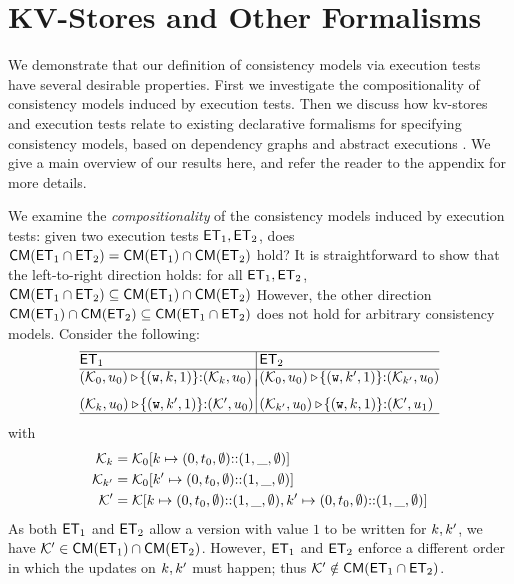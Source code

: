 \newcommand{\execs}{\ensuremath{\mathsf{Execs}}}

\section{KV-Stores and Other Formalisms}
\label{sec:other_formalisms}

We demonstrate that our definition of consistency models via 
execution tests have several desirable properties. 
First we investigate the compositionality of consistency models 
induced by execution tests. Then we discuss how kv-stores and execution 
tests relate to existing declarative formalisms for specifying  
consistency models, based on dependency graphs \cite{adya} 
and abstract executions \cite{framework-concur}. 
We give a main overview of our results here, and refer the reader to the 
appendix for more details.

We examine the \emph{compositionality} of the  consistency models induced by execution tests:  
\ie given two execution tests $\mathsf{ET}_1, \mathsf{ET}_2$, does 
$\mathsf{CM}(\mathsf{ET}_1 \cap \mathsf{ET}_2) = \mathsf{CM}(\mathsf{ET}_1) \cap \mathsf{CM}(\mathsf{ET}_2)$ hold? 
It is straightforward to show that the left-to-right direction holds: for all $\mathsf{ET}_1, \mathsf{ET}_2$, \( \mathsf{CM}(\mathsf{ET}_1 \cap \mathsf{ET}_2) \subseteq \mathsf{CM}(\mathsf{ET}_1) \cap \mathsf{CM}(\mathsf{ET}_2) \) 
However, the other direction \( \mathsf{CM}(\mathsf{ET}_1) \cap \mathsf{CM}(\mathsf{ET}_2) \subseteq \mathsf{CM}(\mathsf{ET}_1 \cap \mathsf{ET}_2) \) does not hold for arbitrary consistency models.
Consider the following:
\[
\small
\begin{array}{@{}l @{\hspace{2pt}} | @{\hspace{2pt}} l@{}}
    \hline
    \ET_1 & \ET_2 \\
%    
    \hline
    (\hh_{0}, \vi_{0}) \csat\! \{(\otW, \ke, 1)\} {:} ( \hh_{\ke}, \vi_{0})
    &
    (\hh_{0}, \vi_{0}) \csat\! \{(\otW, \ke', 1)\} {:} ( \hh_{\ke'}, \vi_{0}) 
    \vspace{-5pt}\\\\
    (\hh_{\ke}, \vi_{0}) \csat  \!\{(\otW, \ke', 1)\} {:} (\hh',\vi_{0}) 
    &
    (\hh_{\ke'}, \vi_{0}) \csat \!\{(\otW, \ke, 1)\} {:} (\hh',\vi_{1}) 
    \\
\hline
\end{array}
\]
with 
\begin{align*}
    \mathcal{K}_{k} & = \mathcal{K}_{0}[k \mapsto (0, t_{0}, \emptyset) \mathbb{::} (1, \_, \emptyset)] \\
    \mathcal{K}_{k'} & = \mathcal{K}_{0}[k' \mapsto (0, t_{0}, \emptyset) \mathbb{::} (1, \_, \emptyset)] \\
    \mathcal{K}' & = \mathcal{K}[k \mapsto (0, t_{0}, \emptyset) \mathbb{::} (1, \_, \emptyset) 
                ,k' \mapsto (0, t_{0}, \emptyset) \mathbb{::} (1, \_, \emptyset)] \\
\end{align*}
As both $\mathsf{ET}_1$ and $\mathsf{ET}_2$ allow a version with value $1$ to be written for 
$k, k'$,  we have $\mathcal{K}' \in \mathsf{CM}(\mathsf{ET}_1) \cap \mathsf{CM}(\mathsf{ET}_2)$. 
However, $\mathsf{ET}_1$ and $\mathsf{ET}_2$ enforce a different order in which the updates on $k, k'$ must happen; 
thus $\mathcal{K}' \notin \mathsf{CM}(\mathsf{ET}_1 \cap \mathsf{ET}_2)$. 

